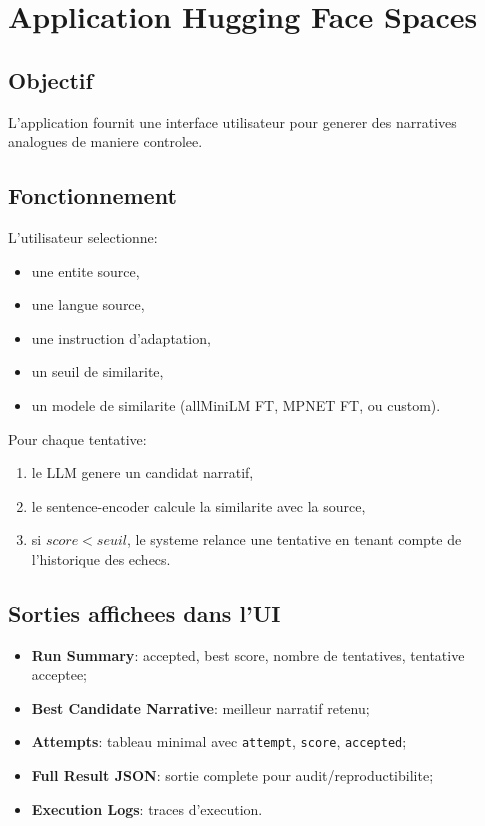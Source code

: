 \chapter{Application Hugging Face Spaces}

\section{Objectif}
L'application fournit une interface utilisateur pour generer des narratives analogues
de maniere controlee.

\section{Fonctionnement}
L'utilisateur selectionne:
\begin{itemize}[leftmargin=2em]
  \item une entite source,
  \item une langue source,
  \item une instruction d'adaptation,
  \item un seuil de similarite,
  \item un modele de similarite (allMiniLM FT, MPNET FT, ou custom).
\end{itemize}

Pour chaque tentative:
\begin{enumerate}[leftmargin=2em]
  \item le LLM genere un candidat narratif,
  \item le sentence-encoder calcule la similarite avec la source,
  \item si \(score < seuil\), le systeme relance une tentative en tenant compte
  de l'historique des echecs.
\end{enumerate}

\section{Sorties affichees dans l'UI}
\begin{itemize}[leftmargin=2em]
  \item \textbf{Run Summary}: accepted, best score, nombre de tentatives, tentative acceptee;
  \item \textbf{Best Candidate Narrative}: meilleur narratif retenu;
  \item \textbf{Attempts}: tableau minimal avec \texttt{attempt}, \texttt{score}, \texttt{accepted};
  \item \textbf{Full Result JSON}: sortie complete pour audit/reproductibilite;
  \item \textbf{Execution Logs}: traces d'execution.
\end{itemize}

